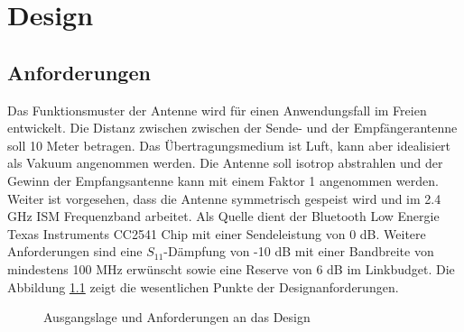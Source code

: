 \newpage 
\chapter{Design}

\section{Anforderungen}
Das Funktionsmuster der Antenne wird für einen Anwendungsfall im Freien entwickelt. Die Distanz zwischen zwischen der Sende- und der Empfängerantenne soll 10 Meter betragen. Das Übertragungsmedium ist Luft, kann aber idealisiert als Vakuum angenommen werden. Die Antenne soll isotrop abstrahlen und der Gewinn der Empfangsantenne kann mit einem Faktor  1 angenommen werden. Weiter ist vorgesehen, dass die Antenne symmetrisch gespeist wird und im 2.4 GHz ISM Frequenzband arbeitet. Als Quelle dient der Bluetooth Low Energie Texas Instruments CC2541 Chip mit einer Sendeleistung von 0 dB. Weitere Anforderungen sind eine $S_{11}$-Dämpfung von -10 dB mit einer Bandbreite von mindestens 100 MHz erwünscht sowie eine Reserve von 6 dB im Linkbudget. Die Abbildung \ref{fig:DesignAusgangslage} zeigt die wesentlichen Punkte der Designanforderungen.

\begin{figure}[!ht]
\begin{center}
\end{center}
\caption{Ausgangslage und Anforderungen an das Design}
\label{fig:DesignAusgangslage}
\end{figure}

